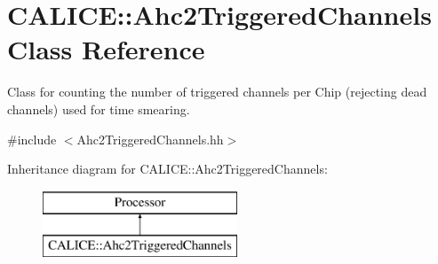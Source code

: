 \section{C\-A\-L\-I\-C\-E\-:\-:Ahc2\-Triggered\-Channels Class Reference}
\label{classCALICE_1_1Ahc2TriggeredChannels}


Class for counting the number of triggered channels per Chip (rejecting dead channels) used for time smearing.  




{\ttfamily \#include $<$Ahc2\-Triggered\-Channels.\-hh$>$}

Inheritance diagram for C\-A\-L\-I\-C\-E\-:\-:Ahc2\-Triggered\-Channels\-:\begin{figure}[H]
\begin{center}
\leavevmode
\includegraphics[height=2.000000cm]{classCALICE_1_1Ahc2TriggeredChannels}
\end{center}
\end{figure}
